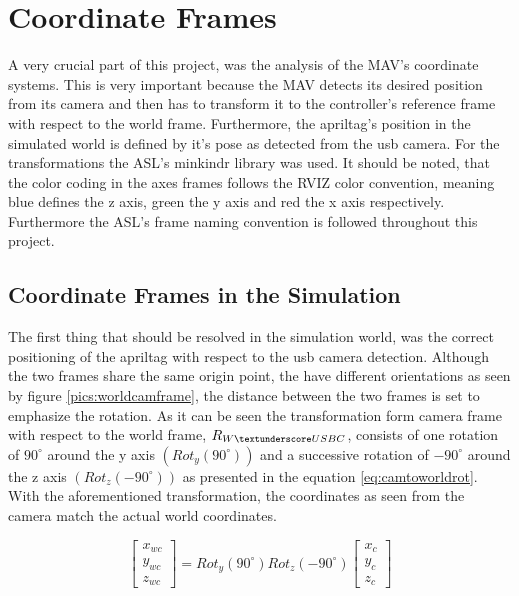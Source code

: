 \section{Coordinate Frames}
\label{sec:CoordianteFrames}

A very crucial part of this project, was the analysis of the MAV's coordinate systems. This is very important because the MAV detects its desired position from  its camera and then has to transform it to the controller's reference frame with respect to the world frame. Furthermore, the apriltag's position in the simulated world is defined by it's pose as detected from the usb camera. For the transformations the ASL's minkindr library was used. It should be noted, that the color coding in the axes frames follows the RVIZ color convention, meaning blue defines the z axis, green the y axis and red the x axis respectively. Furthermore the ASL's frame naming convention \cite{FrameNamingConvention} is followed throughout this project. 

\subsection{Coordinate Frames in the Simulation }
\label{sec: CoordinatesinSimulation}
 
The first thing that should be resolved in the simulation world, was the correct positioning of the apriltag with respect to the usb camera detection. Although the two frames share the same origin point, the have different orientations as seen by figure \ref{pics:worldcamframe}, the distance between the two frames is set to emphasize the rotation. As it can be seen the transformation form camera frame with respect to the world frame, $R_{W\textunderscore USBC}$, consists of one rotation of $90^{\circ}$ around the y axis $(Rot_{y}(90^{\circ}))$ and a successive rotation of $-90^{\circ}$ around the z axis $(Rot_z(-90^{\circ}))$ as presented in the equation \ref{eq:camtoworldrot}. With the aforementioned transformation, the coordinates as seen from the camera match the actual world coordinates. 
 
\begin{equation}
\label{eq:camtoworldrot}
\left[\begin{array}{c}
x_{wc} \\ y_{wc} \\ z_{wc}  \end{array} \right] = Rot_{y}(90^{\circ})Rot_z(-90^{\circ})\left[ \begin{array}{c} x_c \\ y_c \\z_c \end{array} \right]
\end{equation}
 
